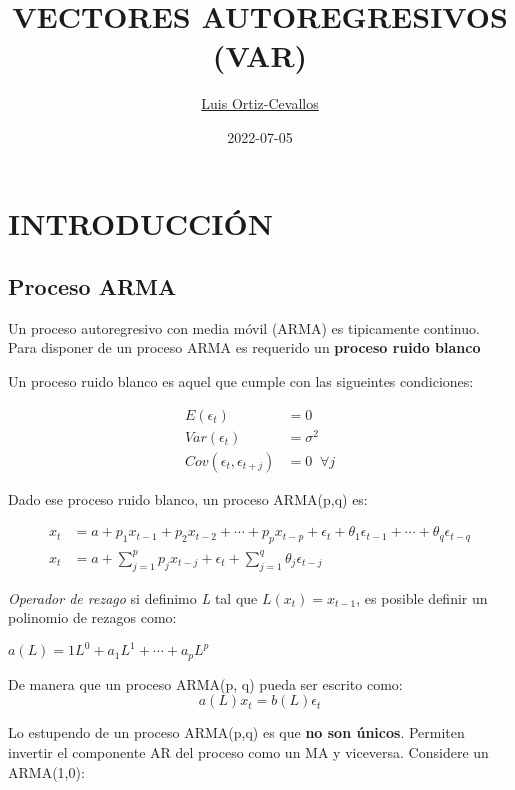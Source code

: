 \documentclass[
]{book}
\title{VECTORES AUTOREGRESIVOS (VAR)}
\author{\href{https://ortiz-cevallos.github.io/MYSELF/}{Luis Ortiz-Cevallos}}
\date{2022-07-05}
\begin{document}
\maketitle

{
\setcounter{tocdepth}{1}
\tableofcontents
}
\hypertarget{introducciuxf3n}{%
\chapter{INTRODUCCIÓN}\label{introducciuxf3n}}

\hypertarget{proceso-arma}{%
\section{Proceso ARMA}\label{proceso-arma}}

Un proceso autoregresivo con media móvil (ARMA) es tipicamente continuo. Para disponer de un proceso ARMA es requerido un \textbf{proceso ruido blanco}

Un proceso ruido blanco es aquel que cumple con las sigueintes condiciones:

\begin{align}
E(\epsilon_{t})&=0\\
Var(\epsilon_{t})&=\sigma^{2}\\
Cov(\epsilon_{t}, \epsilon_{t+j})&=0\;\; \forall j
\end{align}

Dado ese proceso ruido blanco, un proceso ARMA(p,q) es:

\begin{align}
x_{t}&= a+p_{1}x_{t-1}+p_{2}x_{t-2}+\cdots+p_{p}x_{t-p}+\epsilon_{t}+\theta_{1}\epsilon_{t-1}+\cdots+\theta_{q}\epsilon_{t-q}\\
x_{t}&= a+\sum_{j=1}^{p}p_{j}x_{t-j}+\epsilon_{t}+\sum_{j=1}^{q}\theta_{j}\epsilon_{t-j}
\end{align}

\emph{Operador de rezago} si definimo \emph{L} tal que \(L(x_{t})=x_{t-1}\), es posible definir un polinomio de rezagos como:

\(a(L)=1L^{0}+a_{1}L^{1}+\cdots+a_{p}L^{p}\)

De manera que un proceso ARMA(p, q) pueda ser escrito como:
\begin{equation}
a(L)x_{t}=b(L)\epsilon_{t}
\end{equation}

Lo estupendo de un proceso ARMA(p,q) es que \textbf{no son únicos}. Permiten invertir el componente AR del proceso como un MA y viceversa. Considere un ARMA(1,0):
\end{document}

